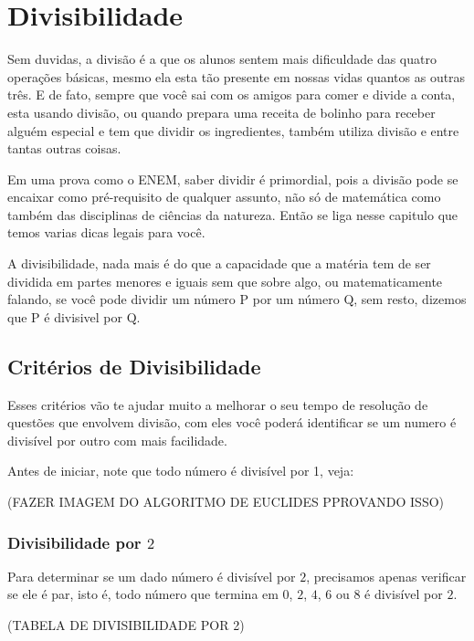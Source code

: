 \chapter{Divisibilidade}
Sem duvidas, a divisão é a que os alunos sentem mais dificuldade das quatro operações básicas, mesmo ela esta tão presente em nossas vidas quantos as outras três. E de fato, sempre que você sai com os amigos para comer e divide a conta, esta usando divisão, ou quando prepara uma receita de bolinho para receber alguém especial e tem que dividir os ingredientes, também utiliza divisão e entre tantas outras coisas.

Em uma prova como o ENEM, saber dividir é primordial, pois a divisão pode se encaixar como pré-requisito de qualquer assunto, não só de matemática como também das disciplinas de ciências da natureza. Então se liga nesse capitulo que temos varias dicas legais para você.

\begin{definition}

 A divisibilidade, nada mais é do que a capacidade que a matéria tem de ser dividida em partes menores e iguais sem que sobre algo, ou matematicamente falando, se você pode dividir um número $\mathrm{P} $  por um número $\mathrm{Q}$, sem resto, dizemos que $\mathrm{P}$ é divisivel por $\mathrm{Q}$.
 \end{definition}
\section{Critérios de Divisibilidade}
Esses critérios vão te ajudar muito a melhorar o seu tempo de resolução de questões que envolvem divisão, com eles você poderá identificar se um numero é divisível por outro com mais facilidade.


Antes de iniciar, note que todo número é divisível por 1, veja: 

(FAZER IMAGEM DO ALGORITMO DE EUCLIDES PPROVANDO ISSO)
\subsection{Divisibilidade por $2$}
Para determinar se um dado número é divisível por $2$, precisamos apenas verificar se ele 
é par, isto é, todo número que termina em $0$, $2$, $4$, $6$ ou $8$ é divisível por $2$.


(TABELA DE DIVISIBILIDADE POR 2)